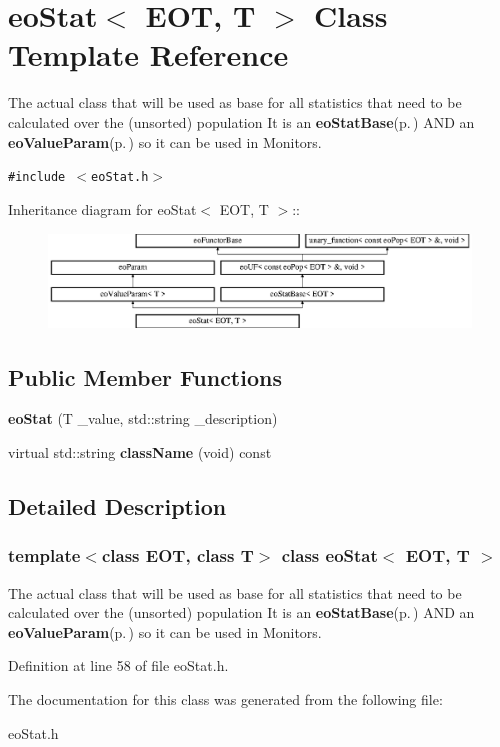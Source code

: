 \section{eo\-Stat$<$ EOT, T $>$ Class Template Reference}
\label{classeo_stat}
The actual class that will be used as base for all statistics that need to be calculated over the (unsorted) population It is an {\bf eo\-Stat\-Base}{\rm (p.\,\pageref{classeo_stat_base})} AND an {\bf eo\-Value\-Param}{\rm (p.\,\pageref{classeo_value_param})} so it can be used in Monitors.  


{\tt \#include $<$eo\-Stat.h$>$}

Inheritance diagram for eo\-Stat$<$ EOT, T $>$::\begin{figure}[H]
\begin{center}
\leavevmode
\includegraphics[height=2.52252cm]{classeo_stat}
\end{center}
\end{figure}
\subsection*{Public Member Functions}
\begin{CompactItemize}
\item 
{\bf eo\-Stat} (T \_\-value, std::string \_\-description)\label{classeo_stat_a0}

\item 
virtual std::string {\bf class\-Name} (void) const \label{classeo_stat_a1}

\end{CompactItemize}


\subsection{Detailed Description}
\subsubsection*{template$<$class EOT, class T$>$ class eo\-Stat$<$ EOT, T $>$}

The actual class that will be used as base for all statistics that need to be calculated over the (unsorted) population It is an {\bf eo\-Stat\-Base}{\rm (p.\,\pageref{classeo_stat_base})} AND an {\bf eo\-Value\-Param}{\rm (p.\,\pageref{classeo_value_param})} so it can be used in Monitors. 



Definition at line 58 of file eo\-Stat.h.

The documentation for this class was generated from the following file:\begin{CompactItemize}
\item 
eo\-Stat.h\end{CompactItemize}
